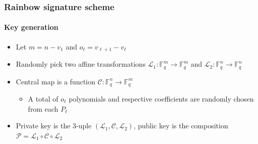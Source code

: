 \documentclass[12pt]{beamer}
\begin{document}
\begin{frame}
  \frametitle{Rainbow signature scheme}
  \framesubtitle{Key generation}
  \begin{itemize}
    \item Let $m = n - v_{1}$ and $o_{\ell} = v_{\ell + 1} - v_{\ell}$
    \item Randomly pick two affine transformations
        $\mathcal{L}_{1} : \mathbb{F}_{q}^{m} \to \mathbb{F}_{q}^{m}$ and
        $\mathcal{L}_{2} : \mathbb{F}_{q}^{n} \to \mathbb{F}_{q}^{n}$
    \item Central map is a function
        $\mathcal{C} : \mathbb{F}_{q}^{n} \to \mathbb{F}_{q}^{m}$
      \begin{itemize}
        \item A total of $o_{\ell}$ polynomials and respective coefficients are
            randomly chosen from each $P_{\ell}$
      \end{itemize}
    \item Private key is the $3$-uple
        $(\mathcal{L}_{1}, \mathcal{C}, \mathcal{L}_{2})$, public key is the
          composition $\mathcal{P} = \mathcal{L}_{1} \circ \mathcal{C} \circ
          \mathcal{L}_{2}$
  \end{itemize}
\end{frame}
\end{document}
